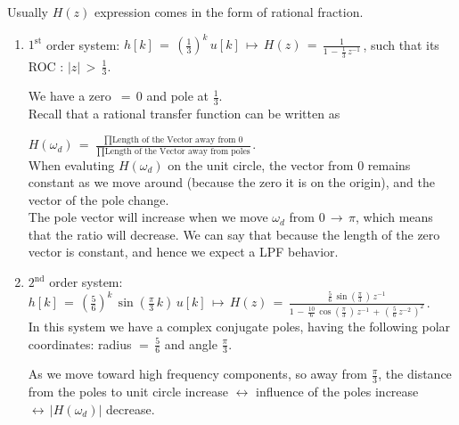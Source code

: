 Usually $H(z)$ expression comes in the form of rational fraction.

\begin{enumerate}

\item $\mathrm{1}^\mathrm{st}$ order system: $h[k] \, = \, \left( \displaystyle\frac{1}{3} \right)^k \, u[k] \, \mapsto \, H(z) \, = \, \displaystyle\frac{1}{1 \, - \, \frac{1}{3} \, z^{-1} } \, $, such that its ROC : $\lvert z \rvert \, > \, \displaystyle\frac{1}{3}$.

We have a zero $\, = \, 0$ and pole at $\frac{1}{3}$.\\

Recall that a rational transfer function can be written as

$H(\omega_d) \, = \, \displaystyle\frac{\prod \text{Length of the Vector away from 0}}{\prod \text{Length of the Vector away from poles}}$.\\

When evaluting $H(\omega_d)$ on the unit circle, the vector from 0 remains constant as we move around (because the zero it is on the origin), and the vector of the pole change.\\

The pole vector will increase when we move $\omega_d$ from $0 \, \rightarrow \, \pi$, which means that the ratio will decrease. We can say that because the length of the zero vector is constant, and hence we expect a LPF behavior.
    
    

\item $\mathrm{2}^\mathrm{nd}$ order system: $h[k] \, = \, \left( \displaystyle\frac{5}{6} \right)^k \, \sin{ \left( \displaystyle\frac{\pi}{3} \, k \right)} \, u[k] \, \mapsto \, H(z) \, = \, \displaystyle\frac{\displaystyle\frac{5}{6} \, \sin{ \left( \displaystyle\frac{\pi}{3} \, \right)} \, z^{-1}  }{1 \, - \, \displaystyle\frac{10}{6}  \, \cos{ \left( \displaystyle\frac{\pi}{3} \, \right)} \,   z^{-1} \, + \,  \left(\, \displaystyle\frac{5}{6} \, z^{-2} \, \right)^2} \, $.\\

In this system we have a complex conjugate poles, having the following polar coordinates: radius $= \, \displaystyle\frac{5}{6} $ and angle $ \displaystyle\frac{\pi}{3}$.


As we move toward high frequency components, so away from $ \displaystyle\frac{\pi}{3}$, the distance from the poles to unit circle increase $\leftrightarrow$ influence of the poles increase $\leftrightarrow \, \lvert H(\omega_d) \rvert$ decrease.\\


\end{enumerate}
